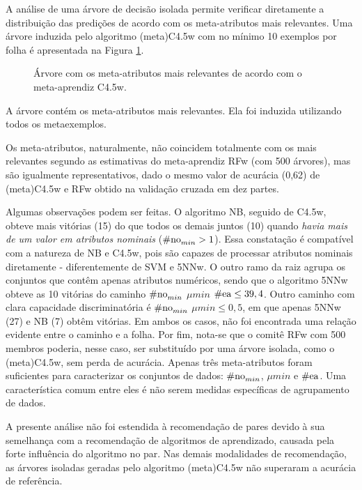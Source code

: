 A análise de uma árvore de decisão isolada permite verificar diretamente a distribuição das predições de acordo com os meta-atributos mais relevantes.
Uma árvore induzida pelo algoritmo (meta)C4.5w com no mínimo 10 exemplos por folha é apresentada na Figura \ref{treebonsalg}.
\begin{figure}
	\centering
	
	\caption[Árvore com os meta-atributos mais relevantes.]{Árvore com os meta-atributos mais relevantes de acordo com o meta-aprendiz C4.5w.}
	\label{treebonsalg}
\end{figure}
A árvore contém os meta-atributos mais relevantes. Ela foi induzida utilizando todos os metaexemplos.

Os meta-atributos, naturalmente, não coincidem totalmente com os mais relevantes segundo as estimativas do meta-aprendiz RFw (com 500 árvores), mas são igualmente representativos, dado o mesmo valor de acurácia (0,62) de (meta)C4.5w e RFw obtido na validação cruzada em dez partes.

Algumas observações podem ser feitas.
O algoritmo NB, seguido de C4.5w, obteve mais vitórias (15) do que todos os demais juntos (10) quando \textit{havia mais de um valor em atributos nominais} ($\operatorname*{\#no}_{min}>1$).
Essa constatação é compatível com a natureza de NB e C4.5w, pois são capazes de processar atributos nominais diretamente - diferentemente de SVM e 5NNw.
O outro ramo da raiz agrupa os conjuntos que contêm apenas atributos numéricos, sendo que o algoritmo 5NNw obteve as 10 vitórias do caminho
$\operatorname*{\#no}_{min}$ \MVRightarrow\phantom{i} $\mu{min}$ \MVRightarrow\phantom{i} $\operatorname*{\#ea}\leq 39,4$.
Outro caminho com clara capacidade discriminatória é $\operatorname*{\#no}_{min}$ \MVRightarrow\phantom{i} $\mu{min}\leq 0,5$, em que apenas 5NNw (27) e NB (7) obtêm vitórias.
Em ambos os casos, não foi encontrada uma relação evidente entre o caminho e a folha.
Por fim, nota-se que o comitê RFw com 500 membros poderia, nesse caso, ser substituído por uma árvore isolada, como o (meta)C4.5w, sem perda de acurácia.
Apenas três meta-atributos foram suficientes para caracterizar os conjuntos de dados: $\operatorname*{\#no}_{min}$, $\mu{min}$ e $\operatorname*{\#ea}$.
Uma característica comum entre eles é não serem medidas específicas de agrupamento de dados.

A presente análise não foi estendida à recomendação de pares devido à sua semelhança com a recomendação de algoritmos de aprendizado, causada pela forte influência do algoritmo no par.
Nas demais modalidades de recomendação, as árvores isoladas geradas pelo algoritmo (meta)C4.5w não superaram a acurácia de referência.

